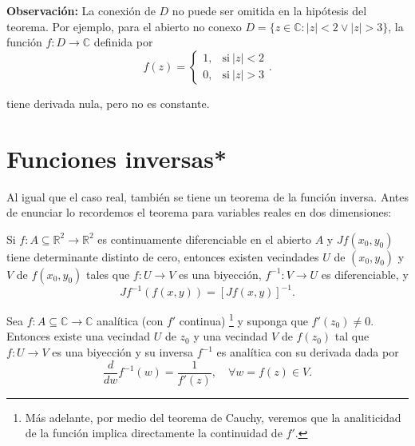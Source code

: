 \textbf{Observación:} La conexión de $D$ no puede ser omitida en la hipótesis del teorema. Por ejemplo, para el abierto no conexo $D = \{z \in \mathbb{C}: |z| < 2 \vee |z|> 3\}$, la función $f: D \rightarrow \mathbb{C}$ definida por
$$f(z) = \left\{ \begin{array}{cl}
     1,& \mbox{si} ~ |z|  < 2  \\
    0, & \mbox{si} ~ |z|  > 3
\end{array} \right. .$$

tiene derivada nula, pero no es constante.

\section{Funciones inversas*}

Al igual que el caso real, también se tiene un teorema de la función inversa. Antes de enunciar lo recordemos el teorema para variables reales en dos dimensiones:

\begin{teorema}\label{InversaCIII}
Si $f: A \subseteq \mathbb{R}^2 \longrightarrow \mathbb{R}^2$ es continuamente diferenciable en el abierto $A$ y $Jf(x_0,y_0)$ tiene determinante distinto de cero, entonces existen vecindades $U$ de $(x_0,y_0)$ y $V$ de $f(x_0,y_0)$ tales que $f: U \longrightarrow V$ es una biyección, $f^{-1}: V \longrightarrow U$ es diferenciable, y
$$Jf^{-1}(f(x,y)) = [Jf(x,y)]^{-1}.$$
\end{teorema}

\begin{teorema}
Sea $f: A \subseteq \mathbb{C} \longrightarrow \mathbb{C}$ analítica (con $f'$ continua) \footnote{Más adelante, por medio del teorema de Cauchy, veremos que  la analiticidad de la función implica directamente la continuidad de $f'$. } y suponga que $f'(z_0) \neq 0$. Entonces existe una vecindad $U$ de $z_0$ y una vecindad $V$ de $f(z_0)$ tal que $f: U \longrightarrow V$ es una biyección y su inversa $f^{-1}$ es analítica con su derivada dada por
$$\frac{d}{dw} f^{-1}(w) = \frac{1}{f'(z)}, \quad \forall w = f(z) \in V.$$
\end{teorema}

